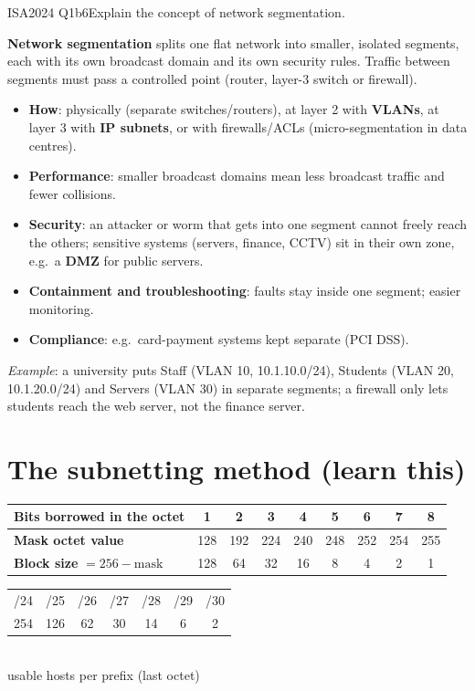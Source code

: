 \documentclass[10pt]{article}
\begin{document}
\begin{pastq}{ISA2024 Q1b}{6}Explain the concept of network segmentation.\end{pastq}
\begin{ans}
\textbf{Network segmentation} splits one flat network into smaller, isolated segments, each with its own broadcast domain and its own security rules. Traffic between segments must pass a controlled point (router, layer-3 switch or firewall).
\begin{itemize}
\item \textbf{How}: physically (separate switches/routers), at layer 2 with \textbf{VLANs}, at layer 3 with \textbf{IP subnets}, or with firewalls/ACLs (micro-segmentation in data centres).
\item \textbf{Performance}: smaller broadcast domains mean less broadcast traffic and fewer collisions.
\item \textbf{Security}: an attacker or worm that gets into one segment cannot freely reach the others; sensitive systems (servers, finance, CCTV) sit in their own zone, e.g.\ a \textbf{DMZ} for public servers.
\item \textbf{Containment and troubleshooting}: faults stay inside one segment; easier monitoring.
\item \textbf{Compliance}: e.g.\ card-payment systems kept separate (PCI DSS).
\end{itemize}
\textit{Example}: a university puts Staff (VLAN 10, 10.1.10.0/24), Students (VLAN 20, 10.1.20.0/24) and Servers (VLAN 30) in separate segments; a firewall only lets students reach the web server, not the finance server.
\end{ans}

\section{The subnetting method (learn this)}\label{sec:method}

\begin{center}
\begin{tabular}{l|*{8}{c}}
\rowcolor{cream}\textbf{Bits borrowed in the octet} & 1 & 2 & 3 & 4 & 5 & 6 & 7 & 8\\\hline
\textbf{Mask octet value} & 128 & 192 & 224 & 240 & 248 & 252 & 254 & 255\\
\textbf{Block size} $= 256 - \text{mask}$ & 128 & 64 & 32 & 16 & 8 & 4 & 2 & 1\\
\end{tabular}

\smallskip
\begin{tabular}{*{7}{c}}
\rowcolor{peach!40}/24 & /25 & /26 & /27 & /28 & /29 & /30\\
254 & 126 & 62 & 30 & 14 & 6 & 2\\
\end{tabular}\\[-2pt]
{\scriptsize\color{midgrey}usable hosts per prefix (last octet)}
\end{center}
\end{document}
